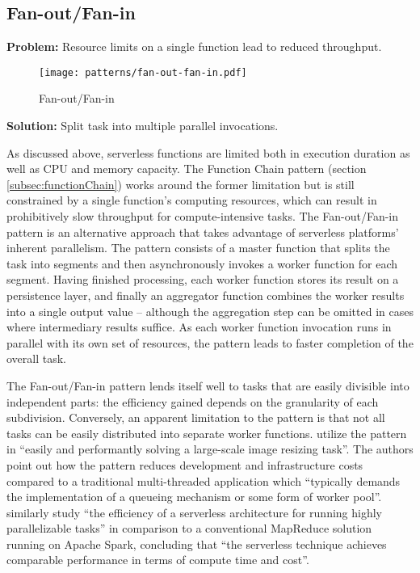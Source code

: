 \subsection{Fan-out/Fan-in} \label{subsec:FanoutFanin}

\textbf{Problem:} Resource limits on a single function lead to reduced throughput.

\begin{figure}[h]
  \centering
  \texttt{[image: patterns/fan-out-fan-in.pdf]}
  \caption{Fan-out/Fan-in}
  \label{fig:fantOutFanIn}
\end{figure}

\textbf{Solution:} Split task into multiple parallel invocations.

As discussed above, serverless functions are limited both in execution duration as well as CPU and memory capacity. The Function Chain pattern (section \ref{subsec:functionChain}) works around the former limitation but is still constrained by a single function's computing resources, which can result in prohibitively slow throughput for compute-intensive tasks. The Fan-out/Fan-in pattern is an alternative approach that takes advantage of serverless platforms' inherent parallelism. The pattern consists of a master function that splits the task into segments and then asynchronously invokes a worker function for each segment. Having finished processing, each worker function stores its result on a persistence layer, and finally an aggregator function combines the worker results into a single output value -- although the aggregation step can be omitted in cases where intermediary results suffice. As each worker function invocation runs in parallel with its own set of resources, the pattern leads to faster completion of the overall task. \parencite{zambrano18patterns}

The Fan-out/Fan-in pattern lends itself well to tasks that are easily divisible into independent parts: the efficiency gained depends on the granularity of each subdivision. Conversely, an apparent limitation to the pattern is that not all tasks can be easily distributed into separate worker functions. \textcite{mcgrath16cloudEventParadigms} utilize the pattern in ``easily and performantly solving a large-scale image resizing task''. The authors point out how the pattern reduces development and infrastructure costs compared to a traditional multi-threaded application which ``typically demands the implementation of a queueing mechanism or some form of worker pool''. \textcite{lavoie19efficiency} similarly study ``the efficiency of a serverless architecture for running highly parallelizable tasks'' in comparison to a conventional MapReduce solution running on Apache Spark, concluding that ``the serverless technique achieves comparable performance in terms of compute time and cost''.

